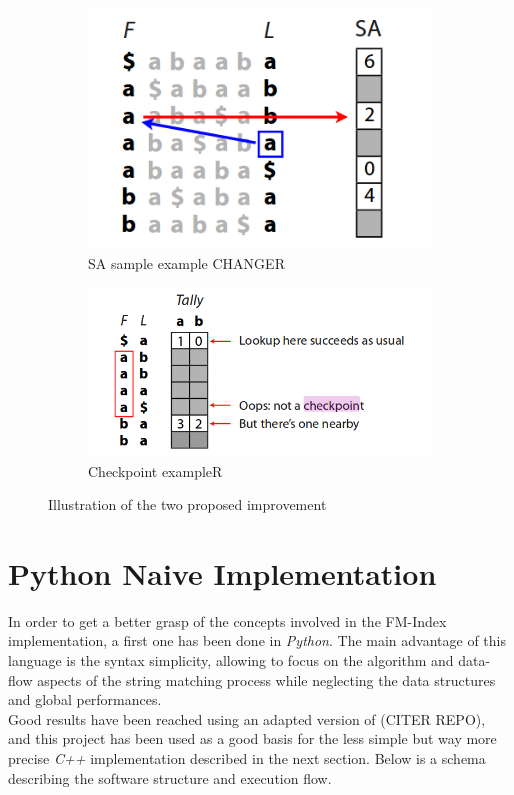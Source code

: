 		\begin{figure}[h]
			\centering
			\begin{subfigure}{.5\textwidth}
				\centering
				\includegraphics[width=.5\linewidth]{Figures/sa.png}
				\caption{SA sample example  CHANGER}
				\label{fig:sub1}
				\end{subfigure}%
				\begin{subfigure}{.5\textwidth}
					\centering
					\includegraphics[width=.8\linewidth]{Figures/CHECKPOINT.png}
					\caption{Checkpoint exampleR}
					\label{fig:sub2}
					\end{subfigure}
					\caption{Illustration of the two proposed improvement}
					\label{fig:test}
					\end{figure}
									

\section{Python Naive Implementation}

In order to get a better grasp of the concepts involved in the FM-Index implementation, a first one has been done in \textsl{Python}. The main advantage of this language is the syntax simplicity, allowing to focus on the algorithm and data-flow aspects of the string matching process while neglecting the data structures and global performances. \\

Good results have been reached using an adapted version of (CITER REPO), and this project has been used as a good basis for the less simple but way more precise \textsl{C++} implementation described in the next section. Below is a schema describing the software structure and execution flow.

